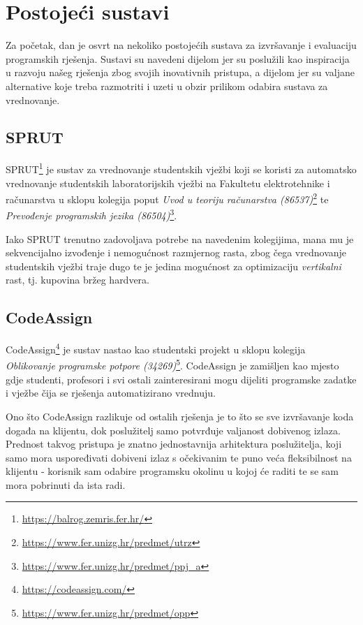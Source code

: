\documentclass[times, utf8, zavrsni]{fer}
\begin{document}

\chapter{Postojeći sustavi}

Za početak, dan je osvrt na nekoliko postojećih sustava za izvršavanje i evaluaciju programskih rješenja. Sustavi su navedeni dijelom jer su poslužili kao inspiracija u razvoju našeg rješenja zbog svojih inovativnih pristupa, a dijelom jer su valjane alternative koje treba razmotriti i uzeti u obzir prilikom odabira sustava za vrednovanje.

\section{SPRUT}

SPRUT{\footnote{\url{https://balrog.zemris.fer.hr/}}} je sustav za vrednovanje studentskih vježbi koji se koristi za automatsko vrednovanje studentskih laboratorijskih vježbi na Fakultetu elektrotehnike i računarstva u sklopu kolegija poput {\textit{Uvod u teoriju računarstva (86537)}}{\footnote{\url{https://www.fer.unizg.hr/predmet/utrz}}} te {\textit{Prevođenje programskih jezika (86504)}}{\footnote{\url{https://www.fer.unizg.hr/predmet/ppj_a}}}.

Iako SPRUT trenutno zadovoljava potrebe na navedenim kolegijima, mana mu je sekvencijalno izvođenje i nemogućnost razmjernog rasta, zbog čega vrednovanje studentskih vježbi traje dugo te je jedina mogućnost za optimizaciju {\textit{vertikalni}} rast, tj. kupovina bržeg hardvera.

\section{CodeAssign}

CodeAssign{\footnote{\url{https://codeassign.com/}}} je sustav nastao kao studentski projekt u sklopu kolegija {\textit{Oblikovanje programske potpore (34269)}}{\footnote{\url{https://www.fer.unizg.hr/predmet/opp}}}. CodeAssign je zamišljen kao mjesto gdje studenti, profesori i svi ostali zainteresirani mogu dijeliti programske zadatke i vježbe čija se rješenja automatizirano vrednuju.

Ono što CodeAssign razlikuje od ostalih rješenja je to što se sve izvršavanje koda događa na klijentu, dok poslužitelj samo potvrđuje valjanost dobivenog izlaza. Prednost takvog pristupa je znatno jednostavnija arhitektura poslužitelja, koji samo mora uspoređivati dobiveni izlaz s očekivanim te puno veća fleksibilnost na klijentu - korisnik sam odabire programsku okolinu u kojoj će raditi te se sam mora pobrinuti da ista radi.
\end{document}

